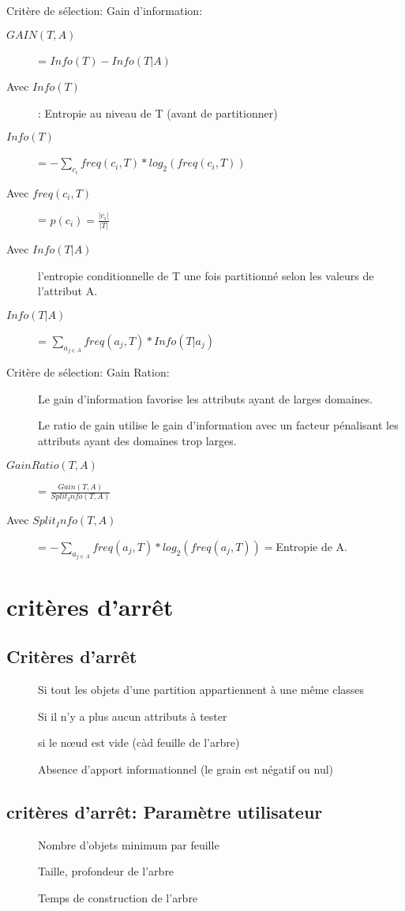 Critère de sélection: Gain d'information:
\begin{description}
\item[$GAIN(T,A)$] = $Info(T) - Info(T|A)$
\item[Avec $Info(T)$]: Entropie au niveau de T (avant de partitionner)
\item[$Info(T)$] = $-\sum_{c_i} freq(c_i,T)*log_2(freq(c_i,T))$
\item[Avec $freq(c_i,T)$] = $p(c_i) = \frac{|c_i|}{|T|}$
\item[Avec $Info(T|A)$] l'entropie conditionnelle de T une fois partitionné selon les valeurs de l'attribut A.
\item[$Info(T|A)$] = $ \sum_{a_{j \in A}} freq(a_j,T) * Info(T | a_j)$
\end{description}

Critère de sélection: Gain Ration:
\begin{description}
\item[] Le gain d’information favorise les attributs ayant de larges domaines.
\item[] Le ratio de gain utilise le gain d’information avec un facteur pénalisant les attributs ayant des domaines trop larges.
\item[$GainRatio(T,A)$] = $\frac{Gain(T,A)}{Split_Info(T,A)}$
\item[Avec $Split_Info(T,A)$] = $- \sum_{a_{j \in A}} freq(a_j,T)*log_2(freq(a_j,T)) = $Entropie de A.
\end{description}

\section{critères d'arrêt}

\subsection{Critères d'arrêt}
\begin{description}
\item[] Si tout les objets d'une partition appartiennent à une même classes
\item[] Si il n'y a plus aucun attributs à tester
\item[] si le nœud est vide (càd feuille de l'arbre)
\item[] Absence d'apport informationnel (le grain est négatif ou nul)
\end{description}

\subsection{critères d'arrêt: Paramètre utilisateur}
\begin{description}
\item[] Nombre d'objets minimum par feuille
\item[] Taille, profondeur de l'arbre
\item[] Temps de construction de l'arbre
\end{description}

